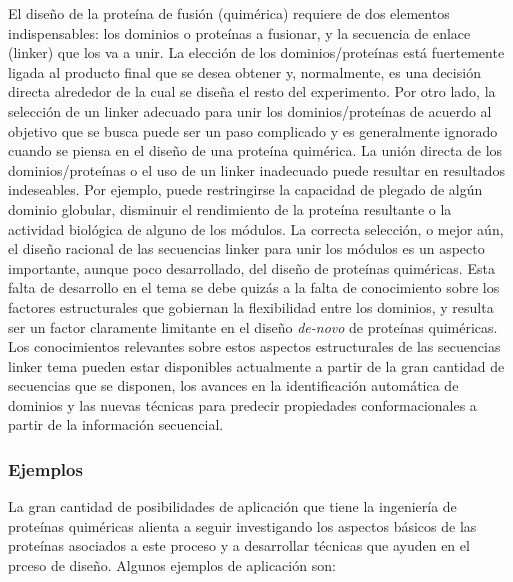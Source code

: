 El diseño de la proteína de fusión (quimérica) requiere de dos elementos indispensables:
los dominios o proteínas a fusionar, y la secuencia de enlace (linker) que los va a unir.
La elección de los dominios/proteínas está fuertemente ligada al producto final que se desea obtener y, normalmente, es una decisión directa alrededor de la cual se diseña el resto del experimento.
Por otro lado, la selección de un linker adecuado para unir los dominios/proteínas de acuerdo al objetivo que se busca puede ser un paso complicado y es generalmente ignorado cuando se piensa en el diseño de una proteína quimérica.
La unión directa de los dominios/proteínas o el uso de un linker inadecuado puede resultar en resultados indeseables. Por ejemplo, puede restringirse la capacidad de plegado de algún dominio globular, 
disminuir el rendimiento de la proteína resultante o la actividad biológica de alguno de los módulos.
La correcta selección, o mejor aún, el diseño racional de las secuencias linker para unir los módulos es un aspecto importante, aunque poco desarrollado, del diseño de proteínas quiméricas. 
Esta falta de desarrollo en el tema se debe quizás a la falta de conocimiento sobre los factores estructurales que gobiernan la flexibilidad entre los dominios, y resulta ser un factor claramente 
limitante en el diseño \textit{de-novo} de proteínas quiméricas. 
Los conocimientos relevantes sobre estos aspectos estructurales de las secuencias linker tema pueden estar disponibles actualmente a partir de la gran cantidad de secuencias que se disponen, los avances en 
la identificación automática de dominios y las nuevas técnicas para predecir propiedades conformacionales a partir de la información secuencial.



\subsubsection{Ejemplos}


%



La gran cantidad de posibilidades de aplicación que tiene la ingeniería de proteínas quiméricas alienta a seguir investigando 
los aspectos básicos de las proteínas asociados a este proceso y a desarrollar técnicas que ayuden en el prceso de diseño.
Algunos ejemplos de aplicación son: 

